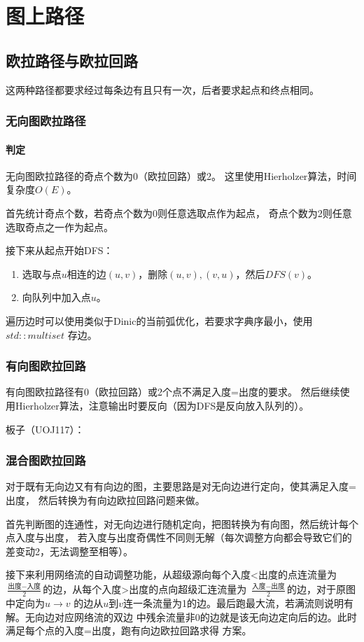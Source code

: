 \section{图上路径}
\subsection{欧拉路径与欧拉回路}
这两种路径都要求经过每条边有且只有一次，后者要求起点和终点相同。
\subsubsection{无向图欧拉路径}
\paragraph{判定} 无向图欧拉路径的奇点个数为0（欧拉回路）或2。
这里使用Hierholzer算法，时间复杂度$O(E)$。

首先统计奇点个数，若奇点个数为0则任意选取点作为起点，
奇点个数为2则任意选取奇点之一作为起点。

接下来从起点开始DFS：
\begin{enumerate}
    \item 选取与点$u$相连的边$(u,v)$，删除$(u,v),(v,u)$，然后$DFS(v)$。
    \item 向队列中加入点$u$。
\end{enumerate}
遍历边时可以使用类似于Dinic的当前弧优化，若要求字典序最小，使用$std::multiset$
存边。
\subsubsection{有向图欧拉回路}
有向图欧拉路径有0（欧拉回路）或2个点不满足入度=出度的要求。
然后继续使用Hierholzer算法，注意输出时要反向（因为DFS是反向放入队列的）。

板子（UOJ117）：

\subsubsection{混合图欧拉回路}
对于既有无向边又有有向边的图，主要思路是对无向边进行定向，使其满足入度=出度，
然后转换为有向边欧拉回路问题来做。

首先判断图的连通性，对无向边进行随机定向，把图转换为有向图，然后统计每个点入度与出度，
若入度与出度奇偶性不同则无解（每次调整方向都会导致它们的差变动2，无法调整至相等）。

接下来利用网络流的自动调整功能，从超级源向每个入度<出度的点连流量为
$\frac{\textrm{出度}-\textrm{入度}}{2}$的边，从每个入度>出度的点向超级汇连流量为
$\frac{\textrm{入度}-\textrm{出度}}{2}$的边，对于原图中定向为$u\rightarrow v$
的边从$u$到$v$连一条流量为1的边。最后跑最大流，若满流则说明有解。无向边对应网络流的双边
中残余流量非0的边就是该无向边定向后的边。此时满足每个点的入度=出度，跑有向边欧拉回路求得
方案。

